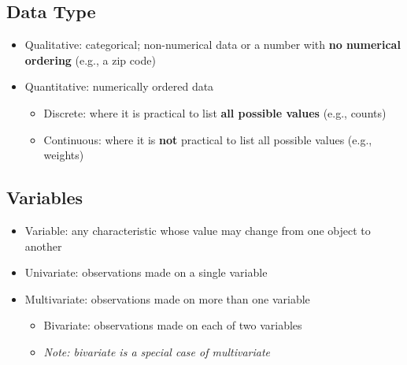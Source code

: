 \documentclass[12pt]{article}
\begin{document}
\begin{center}
\end{center}

\subsection{Data Type}
    \begin{itemize}
        \item Qualitative: categorical; non-numerical data or a number with \textbf{no numerical ordering} (e.g., a zip code)
        \item Quantitative: numerically ordered data
        \begin{itemize}[label=--]
            \item Discrete: where it is practical to list \textbf{all possible values} (e.g., counts)
            \item Continuous: where it is \textbf{not} practical to list all possible values (e.g., weights)
        \end{itemize}
    \end{itemize}

\subsection{Variables}
    \begin{itemize}
        \item Variable: any characteristic whose value may change from one object to another
        \item Univariate: observations made on a single variable
        \item Multivariate: observations made on more than one variable
        \begin{itemize}
            \item Bivariate: observations made on each of two variables
            \item[] \textit{Note: bivariate is a special case of multivariate}
        \end{itemize}
    \end{itemize}
\end{document}
